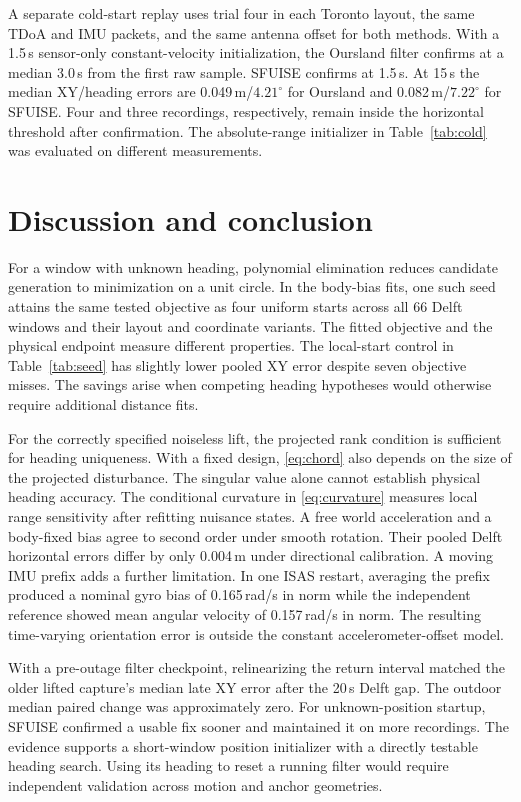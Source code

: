 \documentclass{IEEEtaes}
\begin{document}
A separate cold-start replay uses trial four in each Toronto layout, the same TDoA and IMU packets, and the same antenna offset for both methods. With a 1.5\,s sensor-only constant-velocity initialization, the Oursland filter confirms at a median 3.0\,s from the first raw sample. SFUISE confirms at 1.5\,s. At 15\,s the median XY/heading errors are 0.049\,m/$4.21^\circ$ for Oursland and 0.082\,m/$7.22^\circ$ for SFUISE. Four and three recordings, respectively, remain inside the horizontal threshold after confirmation. The absolute-range initializer in Table~\ref{tab:cold} was evaluated on different measurements.

\section{Discussion and conclusion}\label{sec:conclusion}
For a window with unknown heading, polynomial elimination reduces candidate generation to minimization on a unit circle. In the body-bias fits, one such seed attains the same tested objective as four uniform starts across all 66 Delft windows and their layout and coordinate variants. The fitted objective and the physical endpoint measure different properties. The local-start control in Table~\ref{tab:seed} has slightly lower pooled XY error despite seven objective misses. The savings arise when competing heading hypotheses would otherwise require additional distance fits.

For the correctly specified noiseless lift, the projected rank condition is sufficient for heading uniqueness. With a fixed design, \eqref{eq:chord} also depends on the size of the projected disturbance. The singular value alone cannot establish physical heading accuracy. The conditional curvature in \eqref{eq:curvature} measures local range sensitivity after refitting nuisance states. A free world acceleration and a body-fixed bias agree to second order under smooth rotation. Their pooled Delft horizontal errors differ by only 0.004\,m under directional calibration. A moving IMU prefix adds a further limitation. In one ISAS restart, averaging the prefix produced a nominal gyro bias of 0.165\,rad/s in norm while the independent reference showed mean angular velocity of 0.157\,rad/s in norm. The resulting time-varying orientation error is outside the constant accelerometer-offset model.

With a pre-outage filter checkpoint, relinearizing the return interval matched the older lifted capture's median late XY error after the 20\,s Delft gap. The outdoor median paired change was approximately zero. For unknown-position startup, SFUISE confirmed a usable fix sooner and maintained it on more recordings. The evidence supports a short-window position initializer with a directly testable heading search. Using its heading to reset a running filter would require independent validation across motion and anchor geometries.
\end{document}

